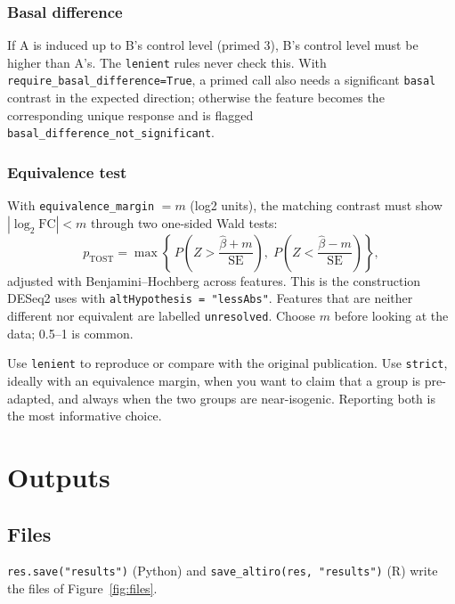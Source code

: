 \documentclass[11pt,a4paper]{article}
\newcommand{\code}[1]{\texttt{\color{navy!85!black}#1}}
\begin{document}
\subsubsection*{Basal difference}
If A is induced up to B's control level (primed 3), B's control level must be higher than A's.
The \code{lenient} rules never check this. With \code{require\_basal\_difference=True}, a primed call
also needs a significant \code{basal} contrast in the expected direction; otherwise the feature becomes
the corresponding unique response and is flagged \code{basal\_difference\_not\_significant}.

\subsubsection*{Equivalence test}
With \code{equivalence\_margin} \(=m\) (log2 units), the matching contrast must show
\(|\log_2\mathrm{FC}|<m\) through two one-sided Wald tests:
\[
p_{\mathrm{TOST}} = \max\left\{\, P\!\left(Z > \frac{\widehat{\beta}+m}{\mathrm{SE}}\right),\;
                               P\!\left(Z < \frac{\widehat{\beta}-m}{\mathrm{SE}}\right) \right\},
\]
adjusted with Benjamini--Hochberg across features. This is the construction DESeq2 uses with
\code{altHypothesis = "lessAbs"}. Features that are neither different nor equivalent are labelled
\code{unresolved}. Choose \(m\) before looking at the data; 0.5--1 is common.

\begin{note}
Use \code{lenient} to reproduce or compare with the original publication. Use \code{strict}, ideally with
an equivalence margin, when you want to claim that a group is pre-adapted, and always when the two
groups are near-isogenic. Reporting both is the most informative choice.
\end{note}

\section{Outputs}
\label{sec:outputs}

\subsection{Files}

\code{res.save("results")} (Python) and \code{save\_altiro(res, "results")} (R) write the files of Figure~\ref{fig:files}.
\end{document}
